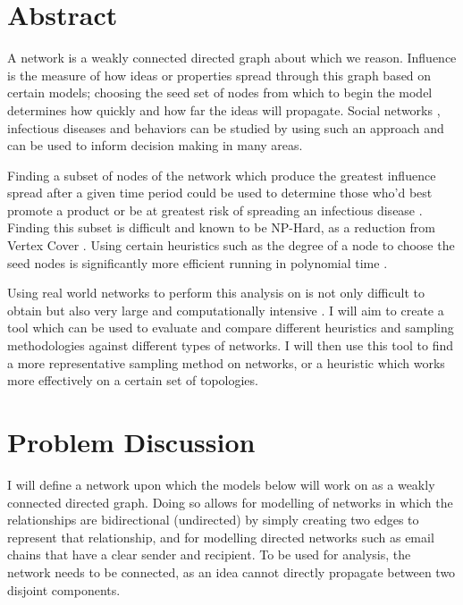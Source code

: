 \documentclass{article}
\begin{document}
\section{Abstract} \label{abstract}

A network is a weakly connected directed graph about which we reason.
Influence is the measure of how ideas or properties spread through this graph based on certain models;
choosing the seed set of nodes from which to begin the model determines how quickly and how far the ideas will propagate.
Social networks \cite{yang2019influence}, infectious diseases and behaviors \cite{archbold2024cvd} can be studied by using such an approach and can be used to inform decision making in many areas.

Finding a subset of nodes of the network which produce the greatest influence spread after a given time period could be used to determine those who'd best promote a product or be at greatest risk of spreading an infectious disease \cite{archbold2024cvd}.
Finding this subset is difficult and known to be NP-Hard, as a reduction from Vertex Cover \cite{kempe2005influential}.
Using certain heuristics such as the degree of a node to choose the seed nodes is significantly more efficient running in polynomial time \cite{chen2009efficient}.

Using real world networks to perform this analysis on is not only difficult to obtain but also very large and computationally intensive \cite{Wang2011UnderstandingGS}.
I will aim to create a tool which can be used to evaluate and compare different heuristics and sampling methodologies against different types of networks.
I will then use this tool to find a more representative sampling method on networks, or a heuristic which works more effectively on a certain set of topologies.

\section{Problem Discussion} \label{probDiscussion}

I will define a network upon which the models below will work on as a weakly connected directed graph.
Doing so allows for modelling of networks in which the relationships are bidirectional (undirected) by simply creating two edges to represent that relationship, and for modelling directed networks such as email chains that have a clear sender and recipient.
To be used for analysis, the network needs to be connected, as an idea cannot directly propagate between two disjoint components.
\end{document}
